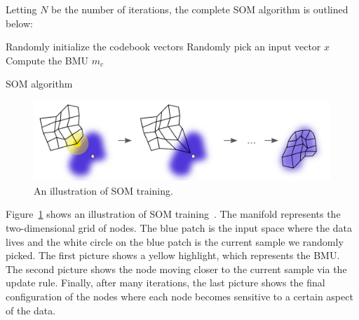 Letting $N$ be the number of iterations,
the complete SOM algorithm is outlined below:

\begin{algorithm}[H]
\SetAlgoLined
Randomly initialize the codebook vectors\;
 {
    Randomly pick an input vector $x$\;
    Compute the BMU $m_c$\;
}
\caption{SOM algorithm}
\end{algorithm}

\begin{figure}[t]
    \centering
    \includegraphics[width=\textwidth]{../figs/som-training.png}
    \caption{An illustration of SOM training.}
    \label{fig:som-training}
\end{figure}

Figure~\ref{fig:som-training} shows an illustration of SOM training~\cite{som-training:2010}.
The manifold represents the two-dimensional grid of nodes.
The blue patch is the input space where the data lives
and the white circle on the blue patch is the current sample we randomly picked.
The first picture shows a yellow highlight, which represents the BMU\@.
The second picture shows the node moving closer to the current sample via the update rule.
Finally, after many iterations, the last picture shows the final configuration
of the nodes where each node becomes sensitive to a certain aspect of the data.

